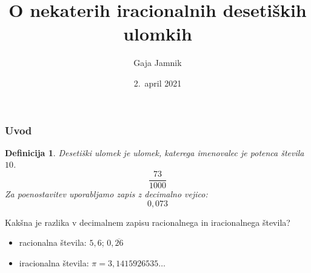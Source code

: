 \documentclass{beamer}
\title{O nekaterih iracionalnih desetiških ulomkih}
\author{Gaja Jamnik}
\institute{Fakulteta za matematiko in fiziko \\
Oddelek za matematiko}
\date{2.\ april 2021}
\newtheorem{definicija}{Definicija}
\begin{document}
    

\begin{frame}
    \titlepage
\end{frame}



\begin{frame}
    \frametitle{Uvod}
    \begin{definicija}
        \alert{Desetiški ulomek}
        je ulomek, katerega imenovalec je potenca števila $10$.
        \[ \frac{73}{1000}\]
        Za poenostavitev uporabljamo zapis z decimalno vejico:
        \[ 0,073\]
    \end{definicija}

    \pause

    Kakšna je razlika v decimalnem zapisu racionalnega in iracionalnega števila?


    \pause
    \begin{itemize}
        \item racionalna števila: $5,6$;  $0,\overline{26}$
        \item iracionalna števila: $\pi = 3,1415926535 \dots$
    \end{itemize}
\end{frame}


\end{document}
